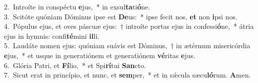 {2.~}Introíte in conspéctu \textbf{e}jus,~* in exsul\textbf{ta}ti\textbf{ó}ne.\\
{3.~}Scitóte quóniam Dóminus ipse est \textbf{De}us:~* ipse fecit nos, \textbf{et} non \textbf{i}psi nos.\\
{4.~}Pópulus ejus, et oves páscuæ ejus:~† introíte portas ejus in confessi\textbf{ó}ne,~* átria ejus in hymnis: confi\textbf{té}mini \textbf{il}li.\\
{5.~}Laudáte nomen ejus: quóniam suávis est Dóminus,~† in ætérnum misericórdia \textbf{e}jus,~* et usque in generatiónem et generatiónem \textbf{vé}ritas \textbf{e}jus.\\
{6.~}Glória Patri, et \textbf{Fí}lio,~* et Spi\textbf{rí}tui \textbf{San}cto.\\
{7.~}Sicut erat in princípio, et nunc, et \textbf{sem}per,~* et in sǽcula sæcu\textbf{ló}rum. \textbf{A}men.\\
